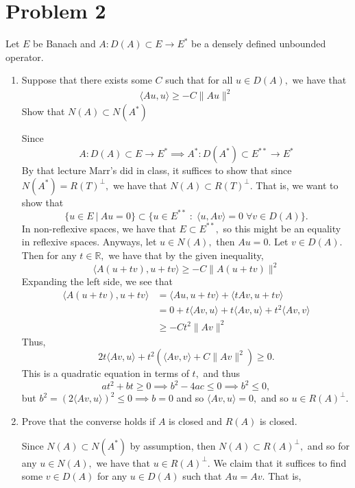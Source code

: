 \documentclass[11pt]{article}
\newcommand{\bbR}{\mathbb{R}}
\begin{document}
\section*{Problem 2}
\begin{problem}
    Let $E$ be Banach and $A: D(A) \subset E \to E^*$ be a densely defined unbounded operator. 
    \begin{enumerate}
        \item Suppose that there exists some $C$ such that for all $u\in D(A),$ we have that 
        \begin{align}
        \langle Au, u\rangle \geq -C\|Au\|^2    
        \end{align}
         Show that $N(A)\subset N(A^*)$
        \begin{solution}
    Since \[A: D(A)\subset E \to E^*\implies A^*:D(A^*)\subset E^{**} \to E^*\]
    By that lecture Marr's did in class, it suffices to show that since $N(A^*) = R(T)^\perp,$  we have that $N(A)\subset R(T)^\perp.$ That is, 
    we want to show that 
    \[\{u \in E \: |\: Au = 0\} \subset \{u\in E^{**} \; : \; \langle u, Av\rangle = 0 \; \forall v \in D(A)\}.\] In non-reflexive spaces, we have that $E\subset E^{**},$ so this might be an equality in reflexive spaces. Anyways, let $u\in N(A),$ then $Au = 0.$ Let $v\in D(A).$ Then for any $t \in \bbR,$ we have that by the given inequality, 
    \[\langle A(u + tv), u + tv \rangle \geq -C \|A(u + tv)\|^2\] Expanding the left side, we see that 
    \begin{align*}
      \langle A(u + tv), u + tv \rangle &= \langle Au, u + tv\rangle + \langle tAv, u + tv \rangle\\ 
      &=0 + t\langle Av, u\rangle +t \langle Av, u\rangle + t^2\langle Av, v\rangle\\
      &\geq -C t^2\|Av\|^2  
    \end{align*}
    Thus, 
    \[2t\langle Av, u\rangle + t^2(\langle Av,v\rangle +C\|Av\|^2) \geq 0.\] This is a quadratic equation in terms of $t,$ and thus 
    \[at^2 + bt \geq 0 \implies b^2 - 4ac \leq 0 \implies b^2 \leq 0,\] but $b^2 = (2\langle Av, u\rangle)^2 \leq 0 \implies b = 0$ and so $\langle Av, u\rangle = 0,$ and so $u \in R(A)^\perp.$ 
        \end{solution}
    \item Prove that the converse holds if $A$ is closed and $R(A)$ is closed. 
    \begin{solution}
        Since $N(A)\subset N(A^*)$ by assumption, then 
        $N(A)\subset R(A)^\perp,$ and so for any $u\in N(A),$ we have that $u\in R(A)^\perp.$ We claim that it suffices to find some $v\in D(A)$ for any $u\in D(A)$ such that $Au = Av.$ That is, 

\end{solution}
\end{enumerate}
\end{problem}
\end{document}

